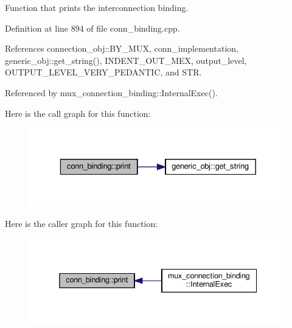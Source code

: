 Function that prints the interconnection binding. 



Definition at line 894 of file conn\+\_\+binding.\+cpp.



References connection\+\_\+obj\+::\+B\+Y\+\_\+\+M\+UX, conn\+\_\+implementation, generic\+\_\+obj\+::get\+\_\+string(), I\+N\+D\+E\+N\+T\+\_\+\+O\+U\+T\+\_\+\+M\+EX, output\+\_\+level, O\+U\+T\+P\+U\+T\+\_\+\+L\+E\+V\+E\+L\+\_\+\+V\+E\+R\+Y\+\_\+\+P\+E\+D\+A\+N\+T\+IC, and S\+TR.



Referenced by mux\+\_\+connection\+\_\+binding\+::\+Internal\+Exec().

Here is the call graph for this function\+:
\nopagebreak
\begin{figure}[H]
\begin{center}
\leavevmode
\includegraphics[width=329pt]{d2/db1/classconn__binding_afa60c298700898adbe9f7c03a4b5cd48_cgraph}
\end{center}
\end{figure}
Here is the caller graph for this function\+:
\nopagebreak
\begin{figure}[H]
\begin{center}
\leavevmode
\includegraphics[width=338pt]{d2/db1/classconn__binding_afa60c298700898adbe9f7c03a4b5cd48_icgraph}
\end{center}
\end{figure}
\mbox{\label{classconn__binding_ae9a6eb2b8e5eb480e94a8a1f04ce58e4}} 

